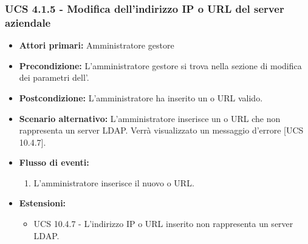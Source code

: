 \subsubsection{UCS 4.1.5 - Modifica dell'indirizzo IP o URL del server aziendale}
\begin{itemize}
	\item \textbf{Attori primari:} Amministratore gestore
	\item \textbf{Precondizione:} L'amministratore gestore si trova nella sezione di modifica dei parametri dell'.
	\item \textbf{Postcondizione:} L'amministratore ha inserito un  o URL valido.
	\item \textbf{Scenario alternativo:} L'amministratore inserisce un  o URL che non rappresenta un server LDAP. Verrà visualizzato un messaggio d'errore [UCS 10.4.7].
	\item \textbf{Flusso di eventi:}
	\begin{enumerate}
		\item L'amministratore inserisce il nuovo  o URL.
	\end{enumerate}
	\item \textbf{Estensioni:}
	\begin{itemize}
		\item UCS 10.4.7 - L'indirizzo IP o URL inserito non rappresenta un server LDAP.
	\end{itemize}
\end{itemize}



